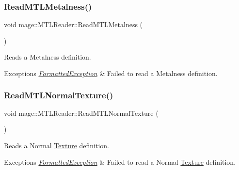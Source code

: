 \subsubsection{\texorpdfstring{Read\+M\+T\+L\+Metalness()}{ReadMTLMetalness()}}
{\footnotesize\ttfamily void mage\+::\+M\+T\+L\+Reader\+::\+Read\+M\+T\+L\+Metalness (\begin{DoxyParamCaption}{ }\end{DoxyParamCaption})\hspace{0.3cm}{\ttfamily [private]}}

Reads a Metalness definition.


\begin{DoxyExceptions}{Exceptions}
{\em \hyperlink{classmage_1_1_formatted_exception}{Formatted\+Exception}} & Failed to read a Metalness definition. \\
\hline
\end{DoxyExceptions}
\hypertarget{classmage_1_1_m_t_l_reader_ae44a5704a09edb722f99a480a58c807a}{}\label{classmage_1_1_m_t_l_reader_ae44a5704a09edb722f99a480a58c807a} 
\subsubsection{\texorpdfstring{Read\+M\+T\+L\+Normal\+Texture()}{ReadMTLNormalTexture()}}
{\footnotesize\ttfamily void mage\+::\+M\+T\+L\+Reader\+::\+Read\+M\+T\+L\+Normal\+Texture (\begin{DoxyParamCaption}{ }\end{DoxyParamCaption})\hspace{0.3cm}{\ttfamily [private]}}

Reads a Normal \hyperlink{classmage_1_1_texture}{Texture} definition.


\begin{DoxyExceptions}{Exceptions}
{\em \hyperlink{classmage_1_1_formatted_exception}{Formatted\+Exception}} & Failed to read a Normal \hyperlink{classmage_1_1_texture}{Texture} definition. \\
\hline
\end{DoxyExceptions}
\hypertarget{classmage_1_1_m_t_l_reader_ad32f39a82a13727d30a76d9bbfacabf3}{}\label{classmage_1_1_m_t_l_reader_ad32f39a82a13727d30a76d9bbfacabf3} 
